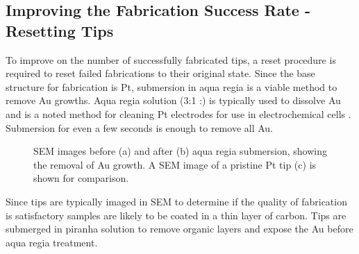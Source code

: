 \subsection{Improving the Fabrication Success Rate - Resetting Tips}

To improve on the number of successfully fabricated tips, a reset procedure is required to reset failed fabrications to their original state. Since the base structure for fabrication is Pt, submersion in aqua regia is a viable method to remove Au growths. Aqua regia solution (3:1 :) is typically used to dissolve Au and is a noted method for cleaning Pt electrodes for use in electrochemical cells \cite{ElectrochemistryForChemists}. Submersion for even a few seconds is enough to remove all Au.

\begin{figure}
\caption{\label{fig:} SEM images before (a) and after (b) aqua regia submersion, showing the removal of Au growth. A SEM image of a pristine Pt tip (c) is shown for comparison.}
\end{figure}

Since tips are typically imaged in SEM to determine if the quality of fabrication is satisfactory samples are likely to be coated in a thin layer of carbon. Tips are submerged in piranha solution to remove organic layers and expose the Au before aqua regia treatment.